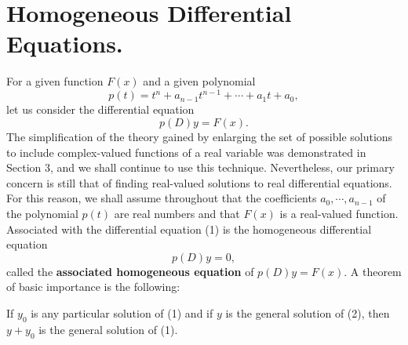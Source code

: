 \section{Homogeneous Differential Equations.} For a given function $F(x)$ and a given polynomial
$$
p(t) = t^n + a_{n-1}t^{n-1} + \cdots + a_1t + a_0,
$$
let us consider the differential equation
\begin{equation}
p(D)y = F(x).  
\label{eq11.4.1}
\end{equation}
The simplification of the theory gained by enlarging the set of possible solutions to include complex-valued functions of a real variable was demonstrated in Section 3, and we shall continue to use this technique. Nevertheless, our primary concern is still that of finding real-valued solutions to real differential equations. For this reason, we shall assume throughout that the coefficients $a_0, \cdots, a_{n-1}$ of the polynomial $p(t)$ are real numbers and that $F(x)$ is a real-valued function. Associated with the differential equation (1) is the homogeneous differential equation
\begin{equation}
p(D)y = 0,   
\label{eq11.4.2}
\end{equation}
called the \textbf{associated homogeneous equation} of $p(D)y = F(x)$. A theorem of basic importance is the following:

\begin{theorem} If $y_0$ is any particular solution of (1) and if $y$ is the general solution of (2), then $y + y_0$ is the general solution of (1).
\end{theorem}

